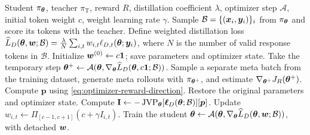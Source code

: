 \documentclass{article} %
\begin{document}
\begin{algorithm}[t]
\caption{Reward-aligned distillation (RAD)}
\label{alg:rad}
\begin{algorithmic}[1]
\Require Student \(\pi_{\bm{\theta}}\), teacher \(\pi_{\mathrm T}\), reward \(R\),
distillation coefficient \(\lambda\), optimizer step \(\mathcal A\),
initial token weight \(c\), weight learning rate \(\gamma\).
    \State Sample \(\mathcal B=\{(\bm{x}_i,\bm{y}_i)\}_i\) from \(\pi_{\bm{\theta}}\) and score its tokens with the teacher.
    \State Define weighted distillation loss \(\widehat L_D(\bm{\theta},\bm{w};\mathcal B)
        =\frac{\lambda}{N}\sum_{i,t}w_{i,t}\ell_{D,t}(\bm{\theta};\bm{y}_i)\), where \(N\) is the number of valid response tokens in \(\mathcal B\).
    \State Initialize \(\bm{w}^{(0)}\gets c\mathbf 1\); save parameters and optimizer state.
    \State Take the temporary step
       \(\bm{\theta}^+\gets\mathcal A(\bm{\theta},
       \nabla_{\bm{\theta}}\widehat L_D(\bm{\theta},c\mathbf 1;\mathcal B))\).
    \State Sample a separate meta batch from the training dataset, generate meta rollouts with
       \(\pi_{\bm{\theta}^+}\), and estimate \(\nabla_{\bm{\theta}^+}J_R(\bm{\theta}^+)\).
    \State Compute \(\boldsymbol p\) using \cref{eq:optimizer-reward-direction}.
    \State Restore the original parameters and optimizer state.
    \State Compute \(\mathbf{I}\gets-\operatorname{JVP}_{\bm{\theta}}
       [\boldsymbol\ell_D(\bm{\theta};\mathcal B)][\boldsymbol p]\).
    \State Update \(w_{i,t}\gets\Pi_{[c-1,c+1]}(c+\gamma I_{i,t})\).
    \State Train the student \(\bm{\theta}\gets\mathcal A(\bm{\theta},
       \nabla_{\bm{\theta}}\widehat L_D(\bm{\theta},\bm{w};\mathcal B))\), with detached \(\bm{w}\).
\EndFor
\end{algorithmic}
\end{algorithm}
\end{document}
